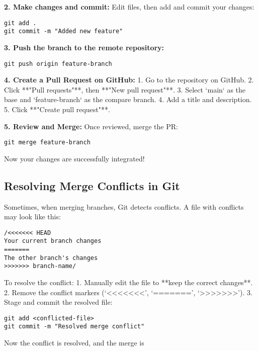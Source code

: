 \textbf{2. Make changes and commit:}
Edit files, then add and commit your changes:
\begin{lstlisting}
git add .
git commit -m "Added new feature"
\end{lstlisting}

\textbf{3. Push the branch to the remote repository:}
\begin{lstlisting}
git push origin feature-branch
\end{lstlisting}

\textbf{4. Create a Pull Request on GitHub:}
1. Go to the repository on GitHub.
2. Click **"Pull requests"**, then **"New pull request"**.
3. Select `main` as the base and `feature-branch` as the compare branch.
4. Add a title and description.
5. Click **"Create pull request"**.

\textbf{5. Review and Merge:}
Once reviewed, merge the PR:
\begin{lstlisting}
git merge feature-branch
\end{lstlisting}

Now your changes are successfully integrated!

\subsection{Resolving Merge Conflicts in Git}

Sometimes, when merging branches, Git detects conflicts. A file with conflicts may look like this:

\begin{lstlisting}
/<<<<<<< HEAD
Your current branch changes
=======
The other branch's changes
>>>>>>> branch-name/
\end{lstlisting}

To resolve the conflict:
1. Manually edit the file to **keep the correct changes**.
2. Remove the conflict markers (`\textless \textless \textless \textless \textless \textless \textless', `=======', `\textgreater \textgreater \textgreater \textgreater \textgreater \textgreater \textgreater').
3. Stage and commit the resolved file:
\begin{lstlisting}
git add <conflicted-file>
git commit -m "Resolved merge conflict"
\end{lstlisting}

Now the conflict is resolved, and the merge is 

